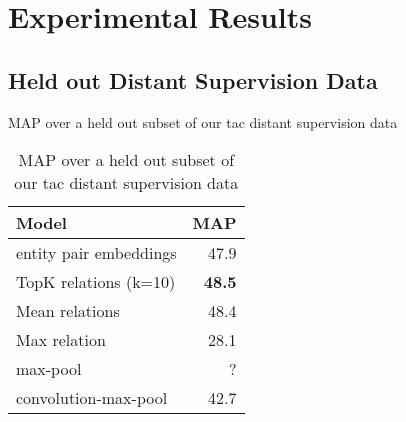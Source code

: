 \section{Experimental Results\label{sec:results}}


\subsection {Held out Distant Supervision Data}
MAP over a held out subset of our tac distant supervision data


\begin{table}[h!]
\setlength{\tabcolsep}{4.1pt}
\begin{center}
\begin{tabular}{|lr|}
\hline
\bf Model & MAP \\
\hline\hline
entity pair embeddings      & 47.9 \\
TopK relations (k=10)       & \bf48.5  \\
Mean relations              & 48.4 \\
Max relation                & 28.1  \\
\hline\hline
max-pool                    & ? \\
convolution-max-pool        & 42.7 \\
\hline

\hline
\end{tabular}
\caption{MAP over a held out subset of our tac distant supervision data
\label{distant-supervision-table}}
\end{center}
\vspace{-.3cm}
\end{table}


%
